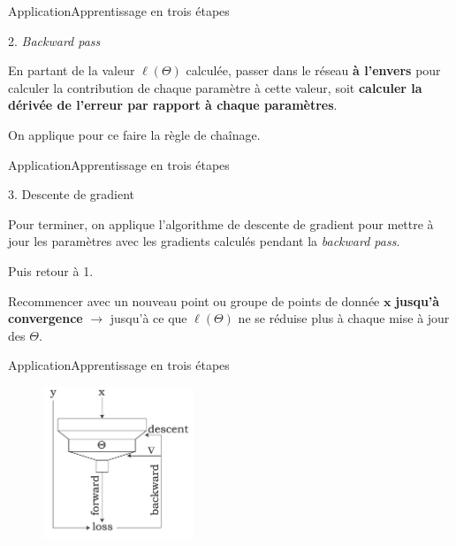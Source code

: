 \documentclass[12pt,dvipsnames,aspectratio=169]{beamer}
\newcommand{\x}[0]{\mathbf{x}}
\begin{document}
\begin{frame}{Application}{Apprentissage en trois étapes}

    \begin{block}{2. \textit{Backward pass}}
    
        En partant de la valeur $\ell({\Theta})$ calculée, passer dans le réseau \textbf{à l'envers} pour calculer la contribution de chaque paramètre à cette valeur, soit \textbf{calculer la dérivée de l'erreur par rapport à chaque paramètres}.\par
        On applique pour ce faire la règle de chaînage. \par
        
    \end{block}
    
\end{frame}


\begin{frame}{Application}{Apprentissage en trois étapes}

    \begin{block}{3. Descente de gradient}
    
        Pour terminer, on applique l'algorithme de descente de gradient pour mettre à jour les paramètres avec les gradients calculés pendant la \textit{backward pass}.
        
    \end{block}
    
    \begin{block}{Puis retour à 1.}
    
        Recommencer avec un nouveau point ou groupe de points de donnée $\x$ \textbf{jusqu'à convergence} $\rightarrow$ jusqu'à ce que $\ell(\Theta)$ ne se réduise plus à chaque mise à jour des $\Theta$.
    \end{block}
    
\end{frame}

\begin{frame}{Application}{Apprentissage en trois étapes}

\begin{figure}
    \centering
    \includegraphics[width=0.4\textwidth]{figures/forwardbackward.pdf}
\end{figure}
    
\end{frame}
\end{document}
